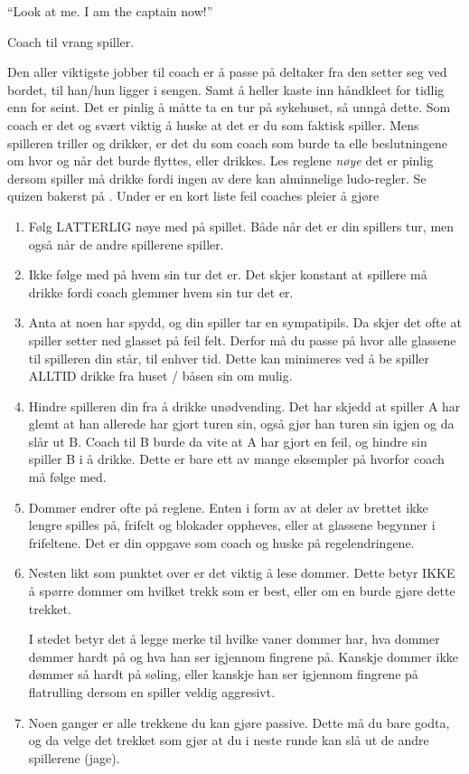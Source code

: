 \documentclass[10pt,a4paper,norsk,openany]{book}
\begin{document}
\epigraph{``Look at me. I am the captain now!''}{Coach til vrang spiller.}

Den aller viktigste jobber til coach er å passe på deltaker fra den setter seg
ved bordet, til han/hun ligger i sengen. Samt å heller kaste inn håndkleet for
tidlig enn for seint. Det er pinlig å måtte ta en tur på sykehuset, så unngå
dette. Som coach er det og svært viktig å huske at det er du som faktisk
spiller. Mens spilleren triller og drikker, er det du som coach som burde ta
elle beslutningene om hvor og når det burde flyttes, eller drikkes. Les reglene
\emph{nøye} det er pinlig dersom spiller må drikke fordi ingen av dere kan
alminnelige ludo-regler. Se quizen bakerst på \pageref{chap:quiz}. Under er en
kort liste feil coaches pleier å gjøre

\begin{enumerate}
    \item Følg LATTERLIG nøye med på spillet. Både når det er din spillers tur,
    men også når de andre spillerene spiller. 
  \item Ikke følge med på hvem sin tur det er. Det skjer konstant at spillere må
    drikke fordi coach glemmer hvem sin tur det er.
  \item Anta at noen har spydd, og din spiller tar en sympatipils. Da skjer det
    ofte at spiller setter ned glasset på feil felt. Derfor må du passe på hvor
    alle glassene til spilleren din står, til enhver tid. Dette kan minimeres
    ved å be spiller ALLTID drikke fra huset / båsen sin om mulig.
  \item Hindre spilleren din fra å drikke unødvending. Det har skjedd at spiller
    A har glemt at han allerede har gjort turen sin, også gjør han turen sin
    igjen og da slår ut B. Coach til B burde da vite at A har gjort en feil, og
    hindre sin spiller B i å drikke. Dette er bare ett av mange eksempler på
    hvorfor coach må følge med.
  \item Dommer endrer ofte på reglene. Enten i form av at deler av brettet ikke
    lengre spilles på, frifelt og blokader oppheves, eller at glassene begynner
    i frifeltene. Det er din oppgave som coach og huske på regelendringene.
  \item Nesten likt som punktet over er det viktig å lese dommer. Dette betyr
    IKKE å spørre dommer om hvilket trekk som er best, eller om en burde gjøre
    dette trekket.

    I stedet betyr det å legge merke til hvilke vaner dommer har, hva dommer
    dømmer hardt på og hva han ser igjennom fingrene på. Kanskje dommer ikke
    dømmer så hardt på søling, eller kanskje han ser igjennom fingrene på
    flatrulling dersom en spiller veldig aggresivt.
  \item Noen ganger er alle trekkene du kan gjøre passive. Dette må du bare
    godta, og da velge det trekket som gjør at du i neste runde kan slå ut de
    andre spillerene (jage).
\end{enumerate}
\end{document}
